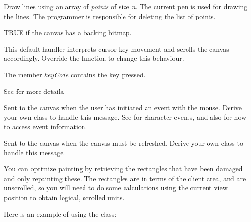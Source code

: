 Draw lines using an array of {\it points} of size {\it n}. The current pen is used
for drawing the lines.  The programmer is responsible for deleting the list of points.



TRUE if the canvas has a backing bitmap.

\label{wxcanvasonchar}


This default handler interprets cursor key movement and scrolls the
canvas accordingly.  Override the function to change this behaviour.

The member {\it keyCode} contains the key pressed.

See  for more details.

\label{wxcanvasonevent}


Sent to the canvas when the user has initiated an event with the mouse.
Derive your own class to handle this message. See \rtfsp
for character events, and also  for how to access
event information.

\label{wxcanvasonpaint}


Sent to the canvas when the canvas must be refreshed. Derive your own
class to handle this message.

You can optimize painting by retrieving the rectangles
that have been damaged and only repainting these. The rectangles are in
terms of the client area, and are unscrolled, so you will need to do
some calculations using the current view position to obtain logical,
scrolled units.

Here is an example of using the  class:

